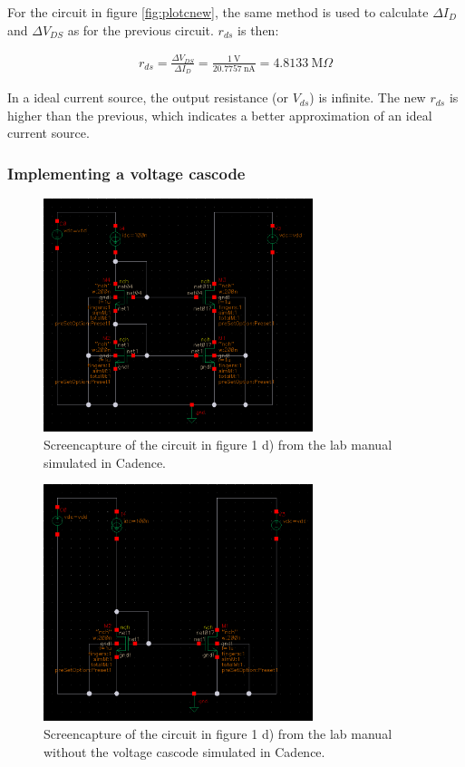 \documentclass[onecolumn]{article}
\begin{document}
For the circuit in figure \ref{fig:plotcnew}, the same method is used to calculate $\Delta I_D$ and $\Delta V_{DS}$ as for the previous circuit. $r_{ds}$ is then:

\begin{align}
    r_{ds} = \frac{\Delta V_{DS}}{\Delta  I_D} = \frac{ 1 \ \text{V}}{20.7757 \ \text{nA}} = 4.8133 \ \text{M}\Omega
\end{align}


In a ideal current source, the output resistance (or $V_{ds}$) is infinite. The new $r_{ds}$ is higher than the previous, which indicates a better approximation of an ideal current source.

\clearpage

\subsubsection{Implementing a voltage cascode}

\begin{figure}[h!]
    \centering
    \includegraphics[width=0.7\textwidth]{circuit_d_cascode.png}
    \caption{Screencapture of the circuit in figure 1 d) from the lab manual simulated in Cadence.}
    \label{fig:circuitd}
\end{figure}

\begin{figure}[h!]
    \centering
    \includegraphics[width=0.7\textwidth]{circuit_d_simple.png}
    \caption{Screencapture of the circuit in figure 1 d) from the lab manual without the voltage cascode simulated in Cadence.}
    \label{fig:circuitdsimple}
\end{figure}
\end{document}
